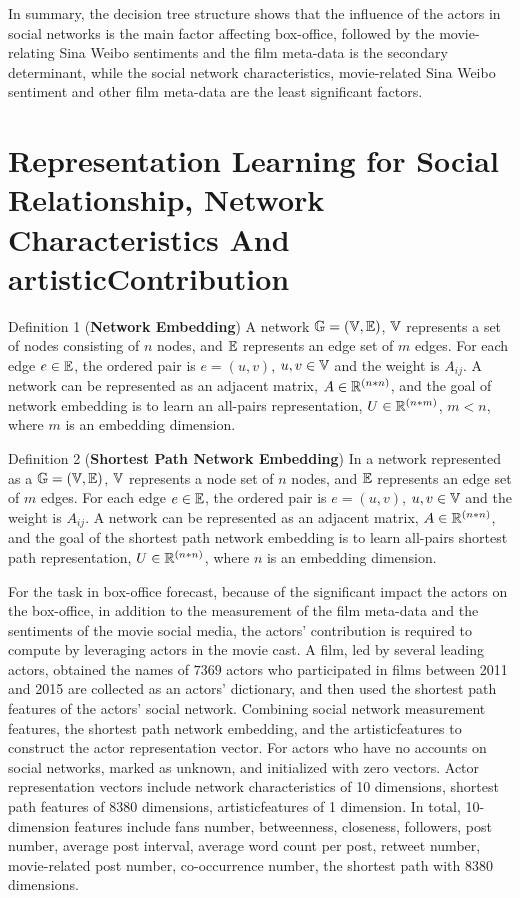 \documentclass[review]{cvpr}
\begin{document}
\par In summary, the decision tree structure shows that the influence of the actors in social networks is the main factor affecting box-office,
followed by the movie-relating Sina Weibo sentiments and the film meta-data is the secondary determinant,
while the social network characteristics, movie-related Sina Weibo sentiment and other film meta-data are the least significant factors.

\section{Representation Learning for Social Relationship, Network Characteristics And artisticContribution}

\par \noindent Definition 1 (\textbf{Network Embedding})  A network $\Bbb G=(\Bbb V,\Bbb E)$, $\Bbb V$ represents a set of nodes consisting of $n$ nodes, and $\Bbb E$ represents an edge set of $m$ edges.
For each edge $e\in \Bbb E$, the ordered pair is $e=(u,v)$, $u,v \in \Bbb V$ and the weight is $A_{ij}$.
A network can be represented as an adjacent matrix, $A\in \Bbb R^{(n*n)}$, and the goal of network embedding is to learn an all-pairs representation, $U\in \Bbb R^{(n*m)}$, $m < n$, where $m$ is an embedding dimension.

\par \noindent Definition 2 (\textbf{Shortest Path Network Embedding})  In a network represented as a $\Bbb G=(\Bbb V,\Bbb E)$, $\Bbb V$ represents a node set of $n$ nodes, and $\Bbb E$ represents an edge set of $m$ edges.
For each edge $e\in \Bbb E$, the ordered pair is $e=(u,v)$, $u,v \in \Bbb V$ and the weight is $A_{ij}$.
A network can be represented as an adjacent matrix, $A\in \Bbb R^{(n*n)}$, and the goal of the shortest path network embedding is to learn all-pairs shortest path representation, $U\in \Bbb R^{(n*n)}$, where $n$ is an embedding dimension.

\par For the task in box-office forecast, because of the significant impact the actors on the box-office, in addition to the measurement of the film meta-data and the sentiments of the movie social media,
the actors' contribution is required to compute by leveraging actors in the movie cast.
A film, led by several leading actors, obtained the names of $7369$ actors who participated in films between 2011 and 2015 are collected as an actors' dictionary, and then used the shortest path features of the actors' social network.
Combining social network measurement features, the shortest path network embedding, and the artisticfeatures to construct the actor representation vector.
For actors who have no accounts on social networks, marked as unknown, and initialized with zero vectors.
Actor representation vectors include network characteristics of 10 dimensions, shortest path features of 8380 dimensions, artisticfeatures of 1 dimension.
In total, 10-dimension features include fans number, betweenness, closeness, followers, post number, average post interval, average word count per post, retweet number, movie-related post number, co-occurrence number, the shortest path with 8380 dimensions.
\end{document}

